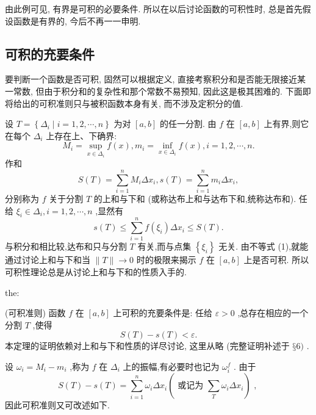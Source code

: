 由此例可见, 有界是可积的必要条件. 所以在以后讨论函数的可积性时, 总是首先假设函数是有界的, 今后不再一一申明.

\subsection{可积的充要条件}

要判断一个函数是否可积, 固然可以根据定义, 直接考察积分和是否能无限接近某一常数, 但由于积分和的复杂性和那个常数不易预知, 因此这是极其困难的. 下面即将给出的可积准则只与被积函数本身有关, 而不涉及定积分的值.

设 \(T = \left\{  {{\Delta }_{i} \mid  i = 1,2,\cdots ,n}\right\}\) 为对 \(\left\lbrack  {a,b}\right\rbrack\) 的任一分割. 由 \(f\) 在 \(\left\lbrack  {a,b}\right\rbrack\) 上有界,则它在每个 \({\Delta }_{i}\) 上存在上、下确界:
\[
{M}_{i} = \mathop{\sup }\limits_{{x \in  {\Delta }_{i}}}f\left( x\right) ,{m}_{i} = \mathop{\inf }\limits_{{x \in  {\Delta }_{i}}}f\left( x\right) ,i = 1,2,\cdots ,n.
\]
作和
\[
S\left( T\right)  = \mathop{\sum }\limits_{{i = 1}}^{n}{M}_{i}\Delta {x}_{i},s\left( T\right)  = \mathop{\sum }\limits_{{i = 1}}^{n}{m}_{i}\Delta {x}_{i},
\]
分别称为 \(f\) 关于分割 \(T\) 的上和与下和 (或称达布上和与达布下和,统称达布和). 任给 \({\xi }_{i} \in  {\Delta }_{i},i = 1,2,\cdots ,n\) ,显然有
\[
s\left( T\right)  \leq  \mathop{\sum }\limits_{{i = 1}}^{n}f\left( {\xi }_{i}\right) \Delta {x}_{i} \leq  S\left( T\right) . \tag{1}
\]
与积分和相比较,达布和只与分割 \(T\) 有关,而与点集 \(\left\{  {\xi }_{i}\right\}\) 无关. 由不等式 (1),就能通过讨论上和与下和当 \(\parallel T\parallel  \rightarrow  0\) 时的极限来揭示 \(f\) 在 \(\left\lbrack  {a,b}\right\rbrack\) 上是否可积. 所以可积性理论总是从讨论上和与下和的性质入手的.

\begin{theorem}{}{the:}

\end{theorem}
 (可积准则) 函数 \(f\) 在 \(\left\lbrack  {a,b}\right\rbrack\) 上可积的充要条件是: 任给 \(\varepsilon  > 0\) ,总存在相应的一个分割 \(T\) ,使得
\[
S\left( T\right)  - s\left( T\right)  < \varepsilon . \tag{2}
\]
本定理的证明依赖对上和与下和性质的详尽讨论, 这里从略 (完整证明补述于 \(§6)\) .

设 \({\omega }_{i} = {M}_{i} - {m}_{i}\) ,称为 \(f\) 在 \({\Delta }_{i}\) 上的振幅,有必要时也记为 \({\omega }_{i}^{f}\) . 由于
\[
S\left( T\right)  - s\left( T\right)  = \mathop{\sum }\limits_{{i = 1}}^{n}{\omega }_{i}\Delta {x}_{i}\left( \right. \text{ 或记为 }\left. {\mathop{\sum }\limits_{T}{\omega }_{i}\Delta {x}_{i}}\right) \text{ , }
\]
因此可积准则又可改述如下.


